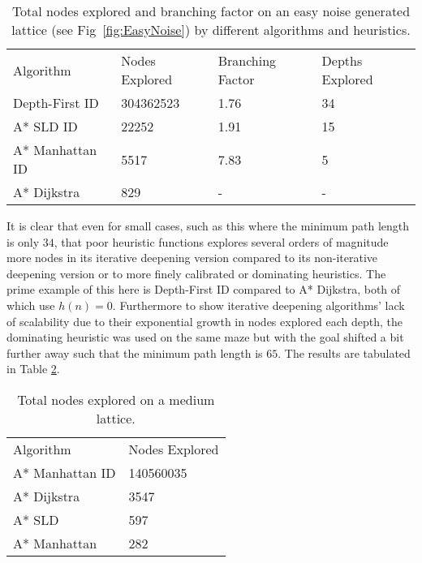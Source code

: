 \documentclass[conference]{IEEEtran}
\begin{document}
\begin{table}[ht]
\begin{tabular}{llll}
Algorithm           & Nodes Explored    &  Branching Factor & Depths Explored \\
Depth-First ID      & 304362523         & 1.76                      & 34\\
A* SLD ID           & 22252             & 1.91                      & 15\\
A* Manhattan ID     & 5517              & 7.83                      & 5 \\
A* Dijkstra         & 829               & -                         & - \\

\end{tabular}
\caption{Total nodes explored and branching factor on an easy noise generated lattice (see Fig~\ref{fig:EasyNoise}) by different algorithms and heuristics.}
\label{tab:NE}
\end{table}

\par
It is clear that even for small cases, such as this where the minimum path length is only $34$, that poor heuristic functions explores several orders of magnitude more nodes in its iterative deepening version compared to its non-iterative deepening version or to more finely calibrated or dominating heuristics. The prime example of this here is Depth-First ID compared to A* Dijkstra, both of which use $h(n) = 0$. Furthermore to show iterative deepening algorithms' lack of scalability due to their exponential growth in nodes explored each depth, the dominating heuristic was used on the same maze but with the goal shifted a bit further away such that the minimum path length is $65$. The results are tabulated in Table \ref{tab:NM}.

\begin{table}[ht]
\begin{tabular}{ll}
Algorithm           & Nodes Explored     \\
A* Manhattan ID     & 140560035         \\
A* Dijkstra         & 3547               \\
A* SLD              & 597               \\
A* Manhattan        & 282               \\

\end{tabular}
\caption{Total nodes explored on a medium lattice.}
\label{tab:NM}
\end{table}
\end{document}
